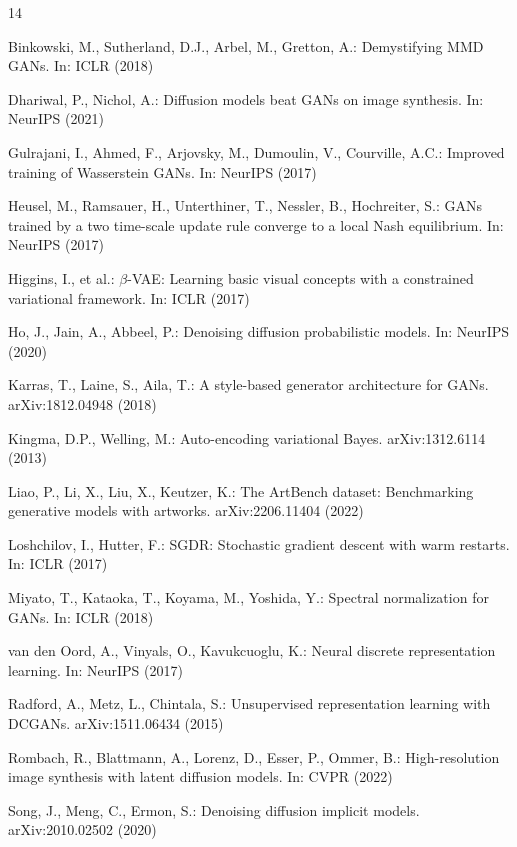 \documentclass[runningheads]{llncs}
\begin{document}

\begin{thebibliography}{14}

Binkowski, M., Sutherland, D.J., Arbel, M., Gretton, A.: Demystifying MMD GANs. In: ICLR (2018)

Dhariwal, P., Nichol, A.: Diffusion models beat GANs on image synthesis. In: NeurIPS (2021)

Gulrajani, I., Ahmed, F., Arjovsky, M., Dumoulin, V., Courville, A.C.: Improved training of Wasserstein GANs. In: NeurIPS (2017)

Heusel, M., Ramsauer, H., Unterthiner, T., Nessler, B., Hochreiter, S.: GANs trained by a two time-scale update rule converge to a local Nash equilibrium. In: NeurIPS (2017)

Higgins, I., et al.: $\beta$-VAE: Learning basic visual concepts with a constrained variational framework. In: ICLR (2017)

Ho, J., Jain, A., Abbeel, P.: Denoising diffusion probabilistic models. In: NeurIPS (2020)

Karras, T., Laine, S., Aila, T.: A style-based generator architecture for GANs. arXiv:1812.04948 (2018)

Kingma, D.P., Welling, M.: Auto-encoding variational Bayes. arXiv:1312.6114 (2013)

Liao, P., Li, X., Liu, X., Keutzer, K.: The ArtBench dataset: Benchmarking generative models with artworks. arXiv:2206.11404 (2022)

Loshchilov, I., Hutter, F.: SGDR: Stochastic gradient descent with warm restarts. In: ICLR (2017)

Miyato, T., Kataoka, T., Koyama, M., Yoshida, Y.: Spectral normalization for GANs. In: ICLR (2018)

van den Oord, A., Vinyals, O., Kavukcuoglu, K.: Neural discrete representation learning. In: NeurIPS (2017)

Radford, A., Metz, L., Chintala, S.: Unsupervised representation learning with DCGANs. arXiv:1511.06434 (2015)

Rombach, R., Blattmann, A., Lorenz, D., Esser, P., Ommer, B.: High-resolution image synthesis with latent diffusion models. In: CVPR (2022)

Song, J., Meng, C., Ermon, S.: Denoising diffusion implicit models. arXiv:2010.02502 (2020)

\end{thebibliography}
\end{document}
